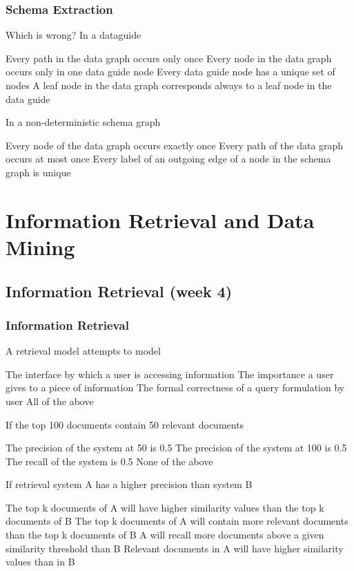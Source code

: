 \documentclass[12pt,a4paper]{exam} %
\begin{document}
\subsubsection{Schema Extraction}
\begin{questions}

\question Which is wrong? In a dataguide
\begin{checkboxes}
\choice Every path in the data graph occurs only once
\CorrectChoice Every node in the data graph occurs only in one data guide node
\choice Every data guide node has a unique set of nodes
\choice A leaf node in the data graph corresponds always to a leaf node in the data guide
\end{checkboxes}

\question In a non-deterministic schema graph
\begin{checkboxes}
\CorrectChoice Every node of the data graph occurs exactly once
\choice Every path of the data graph occurs at most once
\choice Every label of an outgoing edge of a node in the schema graph is unique
\end{checkboxes}
\end{questions}

\section{Information Retrieval and Data Mining}
\subsection{Information Retrieval (week 4)} %
\subsubsection{Information Retrieval}
\begin{questions}
\question A retrieval model attempts to model
\begin{checkboxes}
\choice The interface by which a user is accessing information
\CorrectChoice The importance a user gives to a piece of information
\choice The formal correctness of a query formulation by user
\choice All of the above
\end{checkboxes}

\question If the top 100 documents contain 50 relevant documents
\begin{checkboxes}
\choice The precision of the system at 50 is 0.5
\CorrectChoice The precision of the system at 100 is 0.5
\choice The recall of the system is 0.5
\choice None of the above
\end{checkboxes}

\question If retrieval system A has a higher precision than system B
\begin{checkboxes}
\choice The top k documents of A will have higher similarity values than the top k documents of B
\CorrectChoice The top k documents of A will contain more relevant documents than the top k documents of B
\choice A will recall more documents above a given similarity threshold than B
\choice Relevant documents in A will have higher similarity values than in B
\end{checkboxes}
\end{questions}
\end{document}
